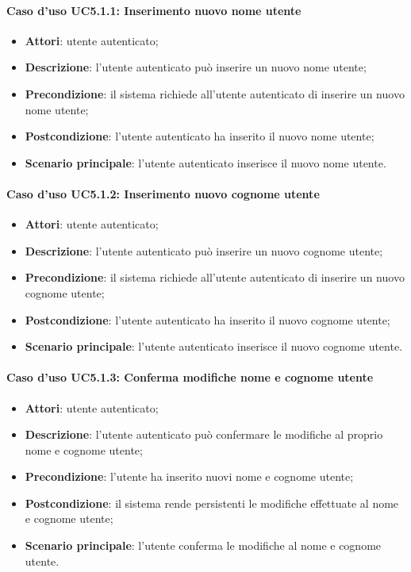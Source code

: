 \paragraph{Caso d'uso UC5.1.1: Inserimento nuovo nome utente}

\begin{itemize}
	\item \textbf{Attori}: utente autenticato;
	\item \textbf{Descrizione}: l'utente autenticato può inserire un nuovo nome utente;
	\item \textbf{Precondizione}: il sistema richiede all'utente autenticato di inserire un nuovo nome utente;
	\item \textbf{Postcondizione}: l'utente autenticato ha inserito il nuovo nome utente;
	\item \textbf{Scenario principale}: l'utente autenticato inserisce il nuovo nome utente.
\end{itemize}

\paragraph{Caso d'uso UC5.1.2: Inserimento nuovo cognome utente}

\begin{itemize}
	\item \textbf{Attori}: utente autenticato;
	\item \textbf{Descrizione}: l'utente autenticato può inserire un nuovo cognome utente;
	\item \textbf{Precondizione}:  il sistema richiede all'utente autenticato di inserire un nuovo cognome utente;
	\item \textbf{Postcondizione}:  l'utente autenticato ha inserito il nuovo cognome utente;
	\item \textbf{Scenario principale}: l'utente autenticato inserisce il nuovo cognome utente.
\end{itemize}

\paragraph{Caso d'uso UC5.1.3: Conferma modifiche nome e cognome utente}

\begin{itemize}
	\item \textbf{Attori}: utente autenticato;
	\item \textbf{Descrizione}: l'utente autenticato può confermare le modifiche al proprio nome e cognome utente;
	\item \textbf{Precondizione}: l'utente ha inserito nuovi nome e cognome utente;
	\item \textbf{Postcondizione}: il sistema rende persistenti le modifiche effettuate al nome e cognome utente;
	\item \textbf{Scenario principale}: l'utente conferma le modifiche al nome e cognome utente.
\end{itemize}


